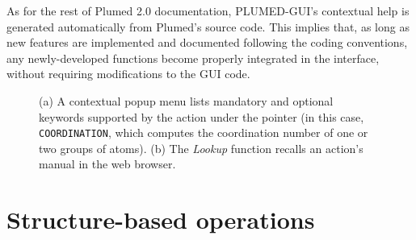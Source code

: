 \documentclass[preprint,12pt]{elsarticle}
\begin{document}
As for the rest of Plumed 2.0 documentation, PLUMED-GUI's contextual
help is generated automatically from Plumed's source code.  This
implies that, as long as new features are implemented and documented
following the coding conventions, any newly-developed functions become
properly integrated in the interface, without requiring modifications
to the GUI code.






\begin{figure}
  \centering
  \caption{(a) A contextual popup menu lists mandatory and
    optional keywords supported by the action under the pointer (in
    this case, \texttt{COORDINATION}, which computes the coordination
    number of one or two groups of atoms). (b) The \emph{Lookup} function
    recalls an action's manual in the web browser. }
  \label{fig:help}
\end{figure}





\section{Structure-based operations}
\end{document}
